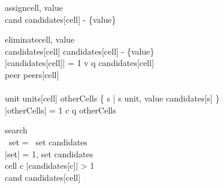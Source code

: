     \begin{center}
    \begin{pseudocode}[framebox]{assign}{cell, value}
         \\
        \FOR cand \in candidates[cell] - \{value\} \DO {}
        \label{algo:assign}
    \end{pseudocode}
    \begin{pseudocode}[framebox]{eliminate}{cell, value}
         \\
        candidates[cell] \GETS candidates[cell] - \{value\}         \\
        \IF |candidates[cell]| = 1 \THEN \BEGIN
            v \GETS q \in candidates[cell]                          \\
            \FOR peer \in peers[cell] \DO {} \\
        \END                                                        \\
        
        \FOR unit \in units[cell] \DO \BEGIN
            otherCells \GETS \{ s | s \in unit, value \in candidates[s] \}  \\
            \IF |otherCells| = 1 \THEN \BEGIN
                c \GETS q \in otherCells                                    \\
            \END
        \END
        \label{algo:eliminate}
    \end{pseudocode}
    \begin{pseudocode}[framebox]{search}{\emptyset}
         \\
        \IF \exists~set = \emptyset~\forall set \in candidates \THEN \RETURN \FALSE     \\
        \IF |set| = 1, \forall set \in candidates \THEN \RETURN \TRUE                   \\
        cell \GETS c  |candidates[c]| > 1 \AND {}      \\
        \FOR cand \in candidates[cell] \DO \BEGIN
                               \\
            \IF {} \THEN {}
            \ELSE {}       \\
        \END                                            \\
        \RETURN \FALSE
        \label{algo:clp}
    \end{pseudocode}
    \end{center}
    
